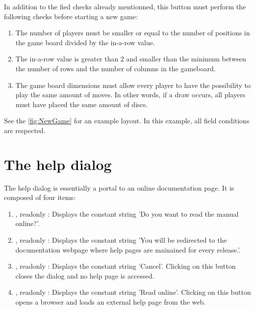   In addition to the fied checks already mentionned, this button must perform the
  following checks before starting a new game:

  \begin{enumerate}
    \item The number of players must be smaller or equal to the number of positions
          in the game board divided by the in-a-row value.
    \item The in-a-row value is greater than 2 and smaller than the minimum between
          the number of rows and the number of columns in the gameboard.
    \item The game board dimensions must allow every player to have the possibility
          to play the same amount of moves. In other words, if a draw occurs, all
          players must have placed the same amount of discs.
  \end{enumerate}

  \noindent See the \cref{fig:NewGame} for an example layout. In this example, all
  field conditions are respected.


\section{The help dialog} \label{dlg:Help}
The help dialog is essentially a portal to an online documentation page. It is
composed of four items:

\begin{enumerate}
  \item {},  readonly : Displays the constant string 'Do you want
                                 to read the manual online?'.
  \item {},  readonly : Displays the constant string 'You will be
                                 redirected to the documentation webpage
                                 where help pages are mainained for every
                                 release.'.
  \item {}, readonly : Displays the constant string 'Cancel'.
                                 Clicking on this button closes the dialog
                                 and no help page is accessed.
  \item {}, readonly : Displays the constant string 'Read online'.
                                 Clicking on this button opens a browser
                                 and loads an external help page from the web.
\end{enumerate}

